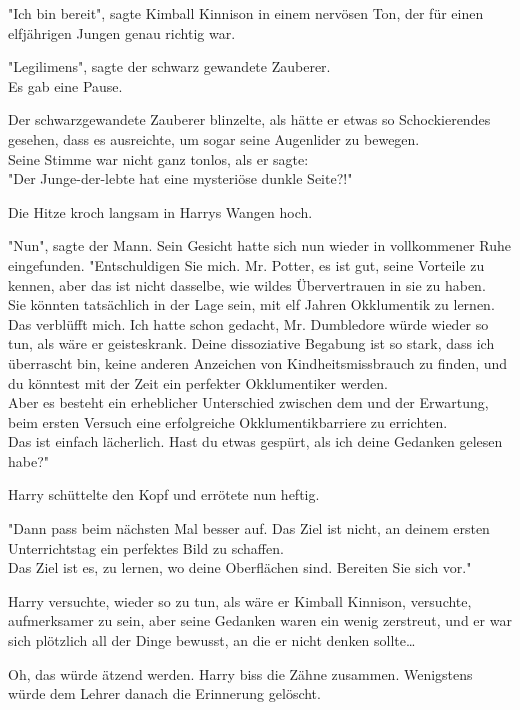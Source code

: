 {"Ich bin bereit", sagte Kimball Kinnison in einem nervösen Ton, der für einen elfjährigen Jungen genau richtig war.

"Legilimens", sagte der schwarz gewandete Zauberer.\\ Es gab eine Pause.

Der schwarzgewandete Zauberer blinzelte, als hätte er etwas so Schockierendes gesehen, dass es ausreichte, um sogar seine Augenlider zu bewegen.\\ Seine Stimme war nicht ganz tonlos, als er sagte:\\ "Der Junge-der-lebte hat eine mysteriöse dunkle Seite?!"

Die Hitze kroch langsam in Harrys Wangen hoch.

"Nun", sagte der Mann. Sein Gesicht hatte sich nun wieder in vollkommener Ruhe eingefunden. "Entschuldigen Sie mich. Mr. Potter, es ist gut, seine Vorteile zu kennen, aber das ist nicht dasselbe, wie wildes Übervertrauen in sie zu haben.\\ Sie könnten tatsächlich in der Lage sein, mit elf Jahren Okklumentik zu lernen. Das verblüfft mich. Ich hatte schon gedacht, Mr. Dumbledore würde wieder so tun, als wäre er geisteskrank. Deine dissoziative Begabung ist so stark, dass ich überrascht bin, keine anderen Anzeichen von Kindheitsmissbrauch zu finden, und du könntest mit der Zeit ein perfekter Okklumentiker werden.\\ Aber es besteht ein erheblicher Unterschied zwischen dem und der Erwartung, beim ersten Versuch eine erfolgreiche Okklumentikbarriere zu errichten.\\ Das ist einfach lächerlich. Hast du etwas gespürt, als ich deine Gedanken gelesen habe?"

Harry schüttelte den Kopf und errötete nun heftig.

"Dann pass beim nächsten Mal besser auf. Das Ziel ist nicht, an deinem ersten Unterrichtstag ein perfektes Bild zu schaffen.\\ Das Ziel ist es, zu lernen, wo deine Oberflächen sind. Bereiten Sie sich vor."

Harry versuchte, wieder so zu tun, als wäre er Kimball Kinnison, versuchte, aufmerksamer zu sein, aber seine Gedanken waren ein wenig zerstreut, und er war sich plötzlich all der Dinge bewusst, an die er nicht denken sollte…

Oh, das würde ätzend werden. Harry biss die Zähne zusammen. Wenigstens würde dem Lehrer danach die Erinnerung gelöscht.

}
